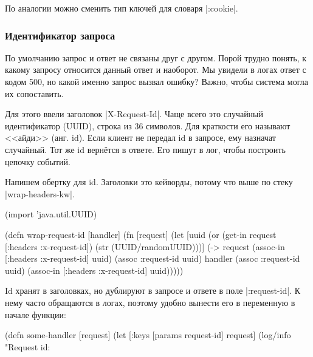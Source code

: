\noindent
По аналогии можно сменить тип ключей для словаря \spverb|:cookie|.

\subsubsection*{Идентификатор запроса}


По умолчанию запрос и ответ не связаны друг с другом. Порой трудно понять, к
какому запросу относится данный ответ и наоборот. Мы увидели в логах ответ с
кодом 500, но какой именно запрос вызвал ошибку? Важно, чтобы система могла их
сопоставить.

Для этого ввели заголовок \spverb|X-Request-Id|. Чаще всего это случайный
идентификатор (UUID), строка из 36 символов. Для краткости его называют <<айди>>
(анг. id). Если клиент не передал id в запросе, ему назначат случайный. Тот же
id верн\"{е}тся в ответе. Его пишут в лог, чтобы построить цепочку событий.


Напишем обертку для id. Заголовки это кейворды, потому что выше по стеку
\spverb|wrap-headers-kw|.

\begin{english}
  \begin{clojure}
(import 'java.util.UUID)

(defn wrap-request-id [handler]
  (fn [request]
    (let [uuid (or (get-in request [:headers :x-request-id])
                   (str (UUID/randomUUID)))]
      (-> request
          (assoc-in [:headers :x-request-id] uuid)
          (assoc :request-id uuid)
          handler
          (assoc :request-id uuid)
          (assoc-in [:headers :x-request-id] uuid)))))
  \end{clojure}
\end{english}


Id хранят в заголовках, но дублируют в запросе и ответе в поле
\spverb|:request-id|. К нему часто обращаются в логах, поэтому удобно вынести
его в переменную в начале функции:


\begin{english}
  \begin{clojure}
(defn some-handler [request]
  (let [{:keys [params request-id]} request]
    (log/info "Request id: %
  \end{clojure}
\end{english}

